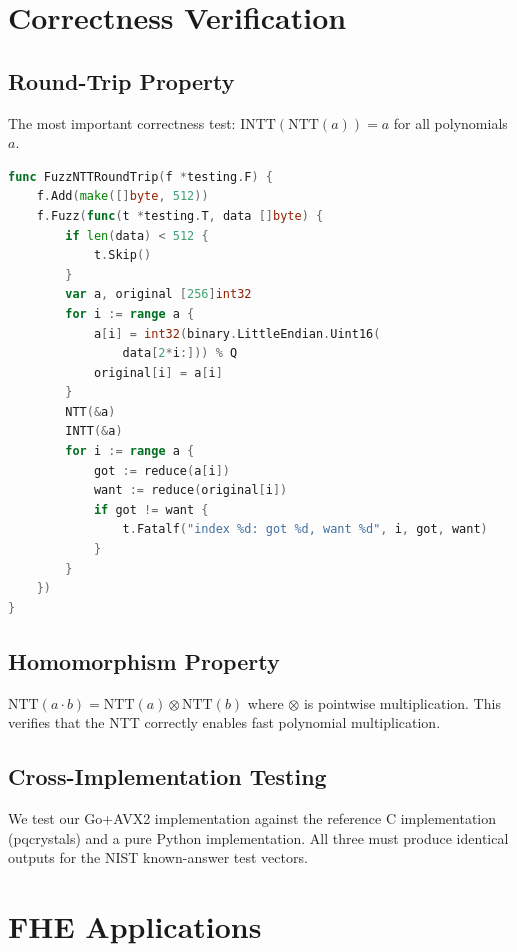 \documentclass[11pt,a4paper]{article}
\begin{document}
\section{Correctness Verification}

\subsection{Round-Trip Property}

The most important correctness test: $\text{INTT}(\text{NTT}(a)) = a$ for all polynomials $a$.

\begin{lstlisting}[language=Go,caption={NTT round-trip fuzz test}]
func FuzzNTTRoundTrip(f *testing.F) {
    f.Add(make([]byte, 512))
    f.Fuzz(func(t *testing.T, data []byte) {
        if len(data) < 512 {
            t.Skip()
        }
        var a, original [256]int32
        for i := range a {
            a[i] = int32(binary.LittleEndian.Uint16(
                data[2*i:])) % Q
            original[i] = a[i]
        }
        NTT(&a)
        INTT(&a)
        for i := range a {
            got := reduce(a[i])
            want := reduce(original[i])
            if got != want {
                t.Fatalf("index %d: got %d, want %d", i, got, want)
            }
        }
    })
}
\end{lstlisting}

\subsection{Homomorphism Property}

$\text{NTT}(a \cdot b) = \text{NTT}(a) \otimes \text{NTT}(b)$ where $\otimes$ is
pointwise multiplication. This verifies that the NTT correctly enables fast polynomial
multiplication.

\subsection{Cross-Implementation Testing}

We test our Go+AVX2 implementation against the reference C implementation (pqcrystals)
and a pure Python implementation. All three must produce identical outputs for the
NIST known-answer test vectors.

\section{FHE Applications}
\end{document}
